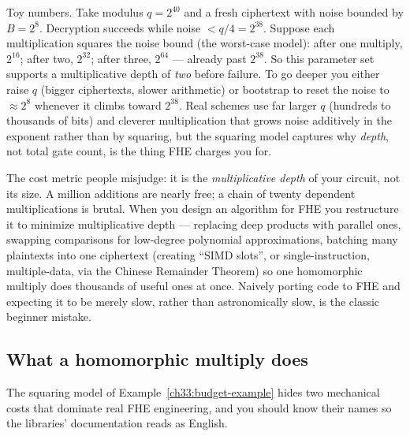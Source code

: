 \begin{example}
\label{ch33:budget-example}
Toy numbers. Take modulus $q = 2^{40}$ and a fresh ciphertext with noise bounded by $B = 2^{8}$. Decryption succeeds while noise $< q/4 = 2^{38}$. Suppose each multiplication squares the noise bound (the worst-case model): after one multiply, $2^{16}$; after two, $2^{32}$; after three, $2^{64}$ --- already past $2^{38}$. So this parameter set supports a multiplicative depth of \emph{two} before failure. To go deeper you either raise $q$ (bigger ciphertexts, slower arithmetic) or bootstrap to reset the noise to $\approx 2^8$ whenever it climbs toward $2^{38}$. Real schemes use far larger $q$ (hundreds to thousands of bits) and cleverer multiplication that grows noise additively in the exponent rather than by squaring, but the squaring model captures why \emph{depth}, not total gate count, is the thing FHE charges you for.
\end{example}

\begin{trapbox}
The cost metric people misjudge: it is the \emph{multiplicative depth} of your circuit, not its size. A million additions are nearly free; a chain of twenty dependent multiplications is brutal. When you design an algorithm for FHE you restructure it to minimize multiplicative depth --- replacing deep products with parallel ones, swapping comparisons for low-degree polynomial approximations, batching many plaintexts into one ciphertext (creating ``SIMD slots'', or single-instruction, multiple-data, via the Chinese Remainder Theorem) so one homomorphic multiply does thousands of useful ones at once. Naively porting code to FHE and expecting it to be merely slow, rather than astronomically slow, is the classic beginner mistake.
\end{trapbox}

\subsection{What a homomorphic multiply does}
\label{ch33:relin}

The squaring model of Example~\ref{ch33:budget-example} hides two mechanical costs that dominate real FHE engineering, and you should know their names so the libraries' documentation reads as English.

